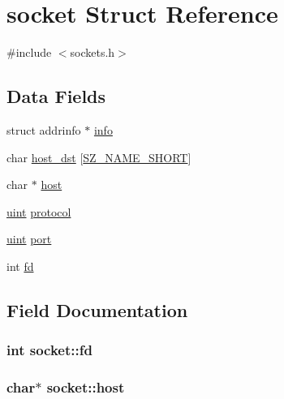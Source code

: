 \hypertarget{structsocket}{}\section{socket Struct Reference}
\label{structsocket}


{\ttfamily \#include $<$sockets.\+h$>$}

\subsection*{Data Fields}
\begin{DoxyCompactItemize}
\item 
struct addrinfo $\ast$ \hyperlink{structsocket_a85b401d22d0c7860590b4ff073fc2348}{info}
\item 
char \hyperlink{structsocket_a960383b98e100a269c3c88c0dcf02745}{host\+\_\+dst} \mbox{[}\hyperlink{sizes_8h_aa1539eb7e3aa7e9eb929e62cfb80e621}{S\+Z\+\_\+\+N\+A\+M\+E\+\_\+\+S\+H\+O\+RT}\mbox{]}
\item 
char $\ast$ \hyperlink{structsocket_ad1c64eaaa9c5182f4b9b87249f619284}{host}
\item 
\hyperlink{generic_8h_a91ad9478d81a7aaf2593e8d9c3d06a14}{uint} \hyperlink{structsocket_a81a5c1e41565a6b97b741c8de80a9c4b}{protocol}
\item 
\hyperlink{generic_8h_a91ad9478d81a7aaf2593e8d9c3d06a14}{uint} \hyperlink{structsocket_a34bc687da597ff0961d2cac70270347a}{port}
\item 
int \hyperlink{structsocket_adce841ceca3a01158a71421e6b0dbd8a}{fd}
\end{DoxyCompactItemize}


\subsection{Field Documentation}
\subsubsection[{\texorpdfstring{fd}{fd}}]{\setlength{\rightskip}{0pt plus 5cm}int socket\+::fd}\hypertarget{structsocket_adce841ceca3a01158a71421e6b0dbd8a}{}\label{structsocket_adce841ceca3a01158a71421e6b0dbd8a}
\subsubsection[{\texorpdfstring{host}{host}}]{\setlength{\rightskip}{0pt plus 5cm}char$\ast$ socket\+::host}\hypertarget{structsocket_ad1c64eaaa9c5182f4b9b87249f619284}{}\label{structsocket_ad1c64eaaa9c5182f4b9b87249f619284}

